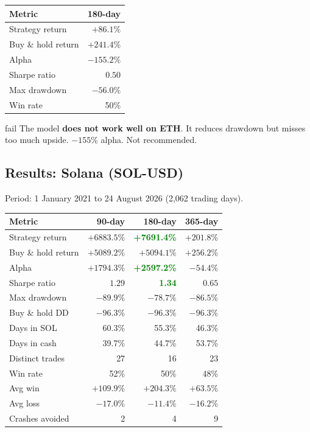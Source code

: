 \documentclass[11pt,a4paper]{article}
\begin{document}
\vspace{0.5em}
\begin{tabular}{@{}lr@{}}
    \toprule
    \textbf{Metric} & \textbf{180-day} \\
    \midrule
    Strategy return    & $+86.1\%$  \\
    Buy \& hold return & $+241.4\%$ \\
    Alpha              & $-155.2\%$ \\
    Sharpe ratio       & $0.50$     \\
    Max drawdown       & $-56.0\%$  \\
    Win rate           & 50\%       \\
    \bottomrule
\end{tabular}

\begin{resultbox}{fail}
The model \textbf{does not work well on ETH}. It reduces drawdown
but misses too much upside. $-155\%$ alpha. Not recommended.
\end{resultbox}

\subsection{Results: Solana (SOL-USD)}

Period: 1 January 2021 to 24 August 2026 (2,062 trading days).

\vspace{0.5em}
\begin{tabular}{@{}lrrr@{}}
    \toprule
    \textbf{Metric} & \textbf{90-day} & \textbf{180-day} & \textbf{365-day} \\
    \midrule
    Strategy return    & $+6883.5\%$ & \textcolor{green}{\textbf{+7691.4\%}} & $+201.8\%$ \\
    Buy \& hold return & $+5089.2\%$ & $+5094.1\%$  & $+256.2\%$ \\
    Alpha              & $+1794.3\%$ & \textcolor{green}{\textbf{+2597.2\%}} & $-54.4\%$  \\
    \midrule
    Sharpe ratio       & $1.29$      & \textcolor{green}{\textbf{1.34}}      & $0.65$     \\
    Max drawdown       & $-89.9\%$   & $-78.7\%$    & $-86.5\%$  \\
    Buy \& hold DD     & $-96.3\%$   & $-96.3\%$    & $-96.3\%$  \\
    \midrule
    Days in SOL        & 60.3\%      & 55.3\%       & 46.3\%     \\
    Days in cash       & 39.7\%      & 44.7\%       & 53.7\%     \\
    Distinct trades    & 27          & 16           & 23         \\
    Win rate           & 52\%        & 50\%         & 48\%       \\
    Avg win            & $+109.9\%$  & $+204.3\%$   & $+63.5\%$  \\
    Avg loss           & $-17.0\%$   & $-11.4\%$    & $-16.2\%$  \\
    Crashes avoided    & 2           & 4            & 9          \\
    \bottomrule
\end{tabular}
\end{document}
